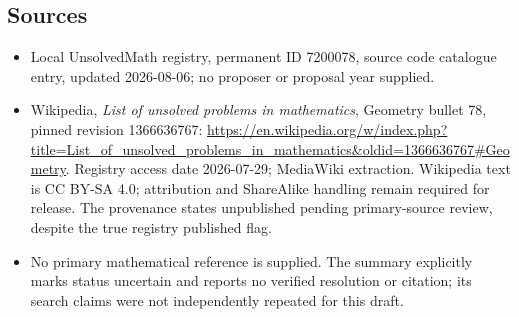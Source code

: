 \documentclass[11pt]{article}
\begin{document}
\subsection{Sources}
\begin{itemize}
\item Local UnsolvedMath registry, permanent ID 7200078, source code catalogue entry, updated 2026-08-06; no proposer or proposal year supplied.
\item Wikipedia, \emph{List of unsolved problems in mathematics}, Geometry bullet 78, pinned revision 1366636767: \url{https://en.wikipedia.org/w/index.php?title=List_of_unsolved_problems_in_mathematics&oldid=1366636767#Geometry}. Registry access date 2026-07-29; MediaWiki extraction. Wikipedia text is CC BY-SA 4.0; attribution and ShareAlike handling remain required for release. The provenance states unpublished pending primary-source review, despite the true registry published flag.
\item No primary mathematical reference is supplied. The summary explicitly marks status uncertain and reports no verified resolution or citation; its search claims were not independently repeated for this draft.
\end{itemize}
\end{document}
